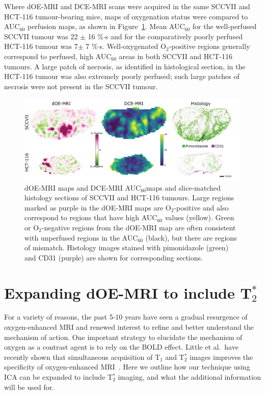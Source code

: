 Where \acs{dOE-MRI} and DCE-MRI scans were acquired in the same SCCVII and HCT-116 tumour-bearing mice,  maps of oxygenation status were compared to \acs{AUC}$_{60}$ perfusion maps, as shown in Figure~\ref{fig_perfusion}.
Mean \acs{AUC}$_{60}$ for the well-perfused SCCVII tumour was 22 $\pm$ 16 \%$\cdot$s and for the comparatively poorly perfused HCT-116 tumour was 7$\pm$ 7 \%$\cdot$s.
Well-oxygenated O$_2$-positive regions generally correspond to perfused, high \acs{AUC}$_{60}$ areas in both SCCVII and HCT-116 tumours.
A large patch of necrosis, as identified in histological section, in the HCT-116 tumour was also extremely poorly perfused; such large patches of necrosis were not present in the SCCVII tumour.

\begin{figure}[htbp]
   \centering
   \includegraphics[width=\textwidth]{futurework/futurework-images/fig_perfusion.png} %
   \caption{\acs{dOE-MRI} maps and DCE-MRI \acs{AUC}$_{60}$maps and slice-matched histology sections of SCCVII and HCT-116 tumours. Large regions marked as purple in the \acs{dOE-MRI} maps are O$_2$-positive and also correspond to regions that have high \acs{AUC}$_{60}$ values (yellow). Green or O$_2$-negative regions from the \acs{dOE-MRI} map are often consistent with unperfused regions in the \acs{AUC}$_{60}$ (black), but there are regions of mismatch. Histology images stained with pimonidazole (green) and CD31 (purple) are shown for corresponding sections.
   \label{fig_perfusion}}
\end{figure}

\section{Expanding \texorpdfstring{\acs{dOE-MRI}}{dOE-MRI} to include \texorpdfstring{T$_2^*$}{T2*}}
\label{futurework:expandingdOEMRI_T2*}

For a variety of reasons, the past 5-10 years have seen a gradual resurgence of oxygen-enhanced MRI and renewed interest to refine and better understand the mechanism of action.
One important strategy to elucidate the mechanism of oxygen as a contrast agent is to rely on the \acs{BOLD} effect. 
Little et al.\ have recently shown that simultaneous acquisition of T$_1$ and T$_2^*$ images improves the specificity of oxygen-enhanced MRI~\cite{Little:2018iu}.
Here we outline how our technique using \acs{ICA} can be expanded to include T$_2^*$ imaging, and what the additional information will be used for.

